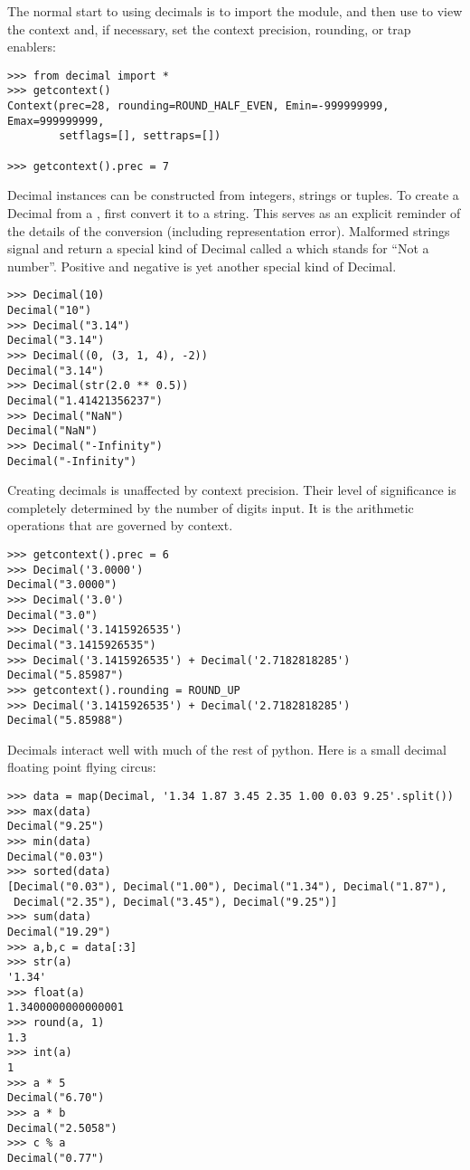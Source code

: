 The normal start to using decimals is to import the module, and then use
 to view the context and, if necessary, set the context
precision, rounding, or trap enablers:

\begin{verbatim}
>>> from decimal import *
>>> getcontext()
Context(prec=28, rounding=ROUND_HALF_EVEN, Emin=-999999999, Emax=999999999,
        setflags=[], settraps=[])

>>> getcontext().prec = 7
\end{verbatim}

Decimal instances can be constructed from integers, strings or tuples.  To
create a Decimal from a , first convert it to a string.  This
serves as an explicit reminder of the details of the conversion (including
representation error).  Malformed strings signal 
and return a special kind of Decimal called a  which stands for
``Not a number''. Positive and negative  is yet another
special kind of Decimal.        

\begin{verbatim}
>>> Decimal(10)
Decimal("10")
>>> Decimal("3.14")
Decimal("3.14")
>>> Decimal((0, (3, 1, 4), -2))
Decimal("3.14")
>>> Decimal(str(2.0 ** 0.5))
Decimal("1.41421356237")
>>> Decimal("NaN")
Decimal("NaN")
>>> Decimal("-Infinity")
Decimal("-Infinity")
\end{verbatim}

Creating decimals is unaffected by context precision.  Their level of
significance is completely determined by the number of digits input.  It is
the arithmetic operations that are governed by context.

\begin{verbatim}
>>> getcontext().prec = 6
>>> Decimal('3.0000')
Decimal("3.0000")
>>> Decimal('3.0')
Decimal("3.0")
>>> Decimal('3.1415926535')
Decimal("3.1415926535")
>>> Decimal('3.1415926535') + Decimal('2.7182818285')
Decimal("5.85987")
>>> getcontext().rounding = ROUND_UP
>>> Decimal('3.1415926535') + Decimal('2.7182818285')
Decimal("5.85988")
\end{verbatim}

Decimals interact well with much of the rest of python.  Here is a small
decimal floating point flying circus:
    
\begin{verbatim}    
>>> data = map(Decimal, '1.34 1.87 3.45 2.35 1.00 0.03 9.25'.split())
>>> max(data)
Decimal("9.25")
>>> min(data)
Decimal("0.03")
>>> sorted(data)
[Decimal("0.03"), Decimal("1.00"), Decimal("1.34"), Decimal("1.87"),
 Decimal("2.35"), Decimal("3.45"), Decimal("9.25")]
>>> sum(data)
Decimal("19.29")
>>> a,b,c = data[:3]
>>> str(a)
'1.34'
>>> float(a)
1.3400000000000001
>>> round(a, 1)
1.3
>>> int(a)
1
>>> a * 5
Decimal("6.70")
>>> a * b
Decimal("2.5058")
>>> c % a
Decimal("0.77")
\end{verbatim}

